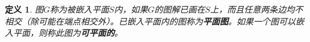 \documentclass{article}
\begin{document}
\begin{CJK}{UTF8}{gbsn}
  \newtheorem*{Def}{定义}
  \huge
\begin{Def}\justifying\let\raggedright\justifying
图$G$称为被嵌入平面$S$内，如果$G$的图解已画在$S$上，而且任意两条边均不相交（除可能在端点相交外）。已嵌入平面内的图称为{\bfseries 平面图}。如果一个图可以嵌入平面，则称此图为{\bfseries 可平面的}。
\end{Def}

\end{CJK}
\end{document}
